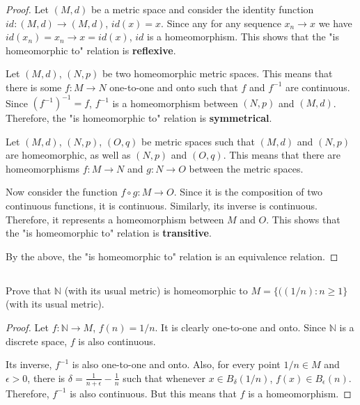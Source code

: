\begin{proof}
Let $(M,d)$ be a metric space and consider the identity function $id: (M,d) \rightarrow (M,d)$, $id(x) = x$. Since any for any sequence $x_n \rightarrow x$ we have $id(x_n) = x_n \rightarrow x = id(x)$, $id$ is a homeomorphism. This shows that the "is homeomorphic to" relation is \textbf{reflexive}.

\vspace{1em}

Let $(M,d)$, $(N,p)$ be two homeomorphic metric spaces. This means that there is some $f:M \rightarrow N$ one-to-one and onto such that $f$ and $f^{-1}$ are continuous. Since $(f^{-1})^{-1} = f$, $f^{-1}$ is a homeomorphism between $(N,p)$ and $(M,d)$. Therefore, the "is homeomorphic to" relation is \textbf{symmetrical}.

\vspace{1em}

Let $(M,d)$, $(N,p)$, $(O,q)$ be metric spaces such that $(M,d)$ and $(N,p)$ are homeomorphic, as well as $(N,p)$ and $(O,q)$. This means that there are homeomorphisms $f:M \rightarrow N$ and $g: N \rightarrow O$ between the metric spaces. 

Now consider the function $f \circ g: M \rightarrow O$. Since it is the composition of two continuous functions, it is continuous. Similarly, its inverse is continuous. Therefore, it represents a homeomorphism between $M$ and $O$. This shows that the "is homeomorphic to" relation is \textbf{transitive}.

\vspace{1em}

By the above, the "is homeomorphic to" relation is an equivalence relation.

\end{proof}

\subsection{} Prove that $\mathbb{N}$ (with its usual metric) is homeomorphic to $M = \{ ( (1/n) : n \geq 1 \}$  (with its usual metric). 

\begin{proof}
Let $f: \mathbb{N} \rightarrow M$, $f(n) = 1/n$. It is clearly one-to-one and onto. Since $\mathbb{N}$ is a discrete space, $f$ is also continuous. 

Its inverse, $f^{-1}$ is also one-to-one and onto. Also, for every point $1/n \in M$ and $\epsilon >0$, there is $\delta = \frac{1}{n+\epsilon} -  \frac{1}{n}$ such that whenever $x \in B_\delta(1/n)$, $f(x) \in B_\epsilon(n)$. Therefore, $f^{-1}$ is also continuous. But this means that $f$ is a homeomorphism. 

\end{proof}

